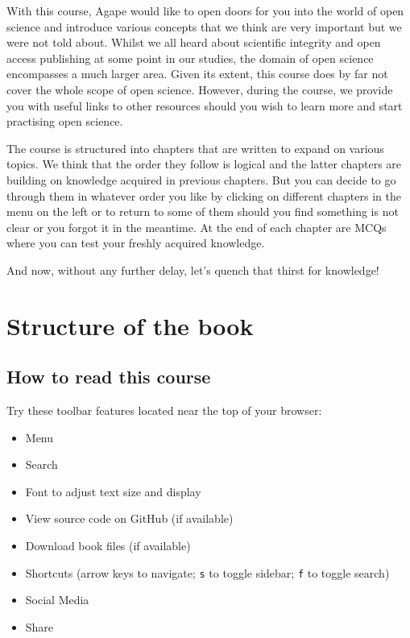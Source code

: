 \documentclass[
]{book}
\providecommand{\tightlist}{%
  \setlength{\itemsep}{0pt}\setlength{\parskip}{0pt}}
\begin{document}
With this course, Agape would like to open doors for you into the world of open science and introduce various concepts that we think are very important but we were not told about. Whilst we all heard about scientific integrity and open access publishing at some point in our studies, the domain of open science encompasses a much larger area. Given its extent, this course does by far not cover the whole scope of open science. However, during the course, we provide you with useful links to other resources should you wish to learn more and start practising open science.

The course is structured into chapters that are written to expand on various topics. We think that the order they follow is logical and the latter chapters are building on knowledge acquired in previous chapters. But you can decide to go through them in whatever order you like by clicking on different chapters in the menu on the left or to return to some of them should you find something is not clear or you forgot it in the meantime. At the end of each chapter are MCQs where you can test your freshly acquired knowledge.

And now, without any further delay, let's quench that thirst for knowledge!

\hypertarget{structure-of-the-book}{%
\section*{Structure of the book}\label{structure-of-the-book}}

\hypertarget{how-to-read-this-course}{%
\subsection*{How to read this course}\label{how-to-read-this-course}}

Try these toolbar features located near the top of your browser:

\begin{itemize}
\tightlist
\item
  Menu
\item
  Search
\item
  Font to adjust text size and display
\item
  View source code on GitHub (if available)
\item
  Download book files (if available)
\item
  Shortcuts (arrow keys to navigate; \texttt{s} to toggle sidebar; \texttt{f} to toggle search)
\item
  Social Media
\item
  Share
\end{itemize}
\end{document}
